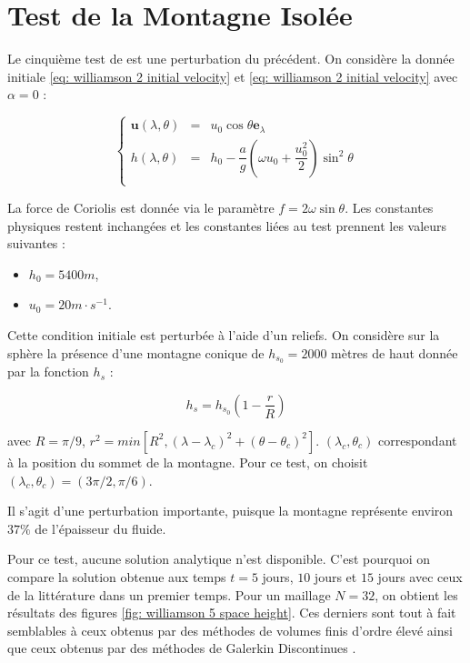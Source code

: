 \newpage
\section{Test de la Montagne Isolée}

Le cinquième test de \cite{Williamson1992} est une perturbation du précédent.
On considère la donnée initiale \eqref{eq: williamson 2 initial velocity} et \eqref{eq: williamson 2 initial velocity} avec $\alpha = 0$ :

\begin{equation}
\left\lbrace
\begin{array}{rcl}
\mathbf{u}(\lambda, \theta) & = & u_0 \cos \theta \mathbf{e}_{\lambda} \\
h(\lambda, \theta) & = & h_0 - \dfrac{a}{g} \left( \omega u_0 + \dfrac{u_0^2}{2} \right) \sin^2 \theta \\
\end{array}
\right.
\end{equation}

La force de Coriolis est donnée via le paramètre $f = 2 \omega \sin \theta$. Les constantes physiques restent inchangées et les constantes liées au test prennent les valeurs suivantes :

\begin{itemize}
\item $h_0 = 5400 m$,
\item $u_0 = 20 m \cdot s^{-1}$.
\end{itemize}

Cette condition initiale est perturbée à l'aide d'un reliefs.
On considère sur la sphère la présence d'une montagne conique de $h_{s_0} = 2000$ mètres de haut donnée par la fonction $h_s$ :

\begin{equation}
h_s = h_{s_0} \left( 1 - \dfrac{r}{R} \right)
\end{equation}

avec $R= \pi / 9$, $r^2 = min \left[ R^2, \left( \lambda - \lambda_c \right)^2 + \left( \theta - \theta_c \right)^2 \right]$. $(\lambda_c, \theta_c)$ correspondant à la position du sommet de la montagne. Pour ce test, on choisit $(\lambda_c, \theta_c) = (3 \pi / 2, \pi / 6)$.

Il s'agit d'une perturbation importante, puisque la montagne représente environ $37 \%$ de l'épaisseur du fluide.

Pour ce test, aucune solution analytique n'est disponible. C'est pourquoi on compare la solution obtenue aux temps $t=5$ jours, $10$ jours et $15$ jours avec ceux de la littérature dans un premier temps. Pour un maillage $N=32$, on obtient les résultats des figures \ref{fig: williamson 5 space height}. Ces derniers sont tout à fait semblables à ceux obtenus par des méthodes de volumes finis \cite{Katta2015, Chen2008} d'ordre élevé ainsi que ceux obtenus par des méthodes de Galerkin Discontinues \cite{Nair2005}. 

